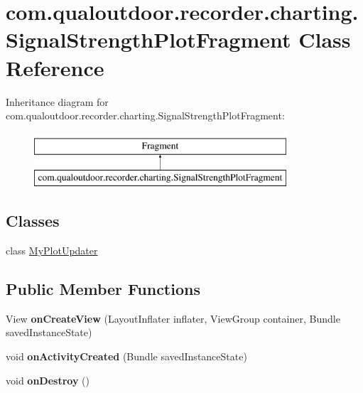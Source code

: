 \hypertarget{classcom_1_1qualoutdoor_1_1recorder_1_1charting_1_1SignalStrengthPlotFragment}{\section{com.\-qualoutdoor.\-recorder.\-charting.\-Signal\-Strength\-Plot\-Fragment Class Reference}
\label{classcom_1_1qualoutdoor_1_1recorder_1_1charting_1_1SignalStrengthPlotFragment}
}
Inheritance diagram for com.\-qualoutdoor.\-recorder.\-charting.\-Signal\-Strength\-Plot\-Fragment\-:\begin{figure}[H]
\begin{center}
\leavevmode
\includegraphics[height=2.000000cm]{classcom_1_1qualoutdoor_1_1recorder_1_1charting_1_1SignalStrengthPlotFragment}
\end{center}
\end{figure}
\subsection*{Classes}
\begin{DoxyCompactItemize}
\item 
class \hyperlink{classcom_1_1qualoutdoor_1_1recorder_1_1charting_1_1SignalStrengthPlotFragment_1_1MyPlotUpdater}{My\-Plot\-Updater}
\end{DoxyCompactItemize}
\subsection*{Public Member Functions}
\begin{DoxyCompactItemize}
\item 
\hypertarget{classcom_1_1qualoutdoor_1_1recorder_1_1charting_1_1SignalStrengthPlotFragment_a6ae8c5a953179150a5fea9316a1357b1}{View {\bfseries on\-Create\-View} (Layout\-Inflater inflater, View\-Group container, Bundle saved\-Instance\-State)}\label{classcom_1_1qualoutdoor_1_1recorder_1_1charting_1_1SignalStrengthPlotFragment_a6ae8c5a953179150a5fea9316a1357b1}

\item 
\hypertarget{classcom_1_1qualoutdoor_1_1recorder_1_1charting_1_1SignalStrengthPlotFragment_aa4786952a20f614f230eebba2463ab5c}{void {\bfseries on\-Activity\-Created} (Bundle saved\-Instance\-State)}\label{classcom_1_1qualoutdoor_1_1recorder_1_1charting_1_1SignalStrengthPlotFragment_aa4786952a20f614f230eebba2463ab5c}

\item 
\hypertarget{classcom_1_1qualoutdoor_1_1recorder_1_1charting_1_1SignalStrengthPlotFragment_a1dc4240b9f2a8ddb6ba8bf5a1c4c9b21}{void {\bfseries on\-Destroy} ()}\label{classcom_1_1qualoutdoor_1_1recorder_1_1charting_1_1SignalStrengthPlotFragment_a1dc4240b9f2a8ddb6ba8bf5a1c4c9b21}

\end{DoxyCompactItemize}
